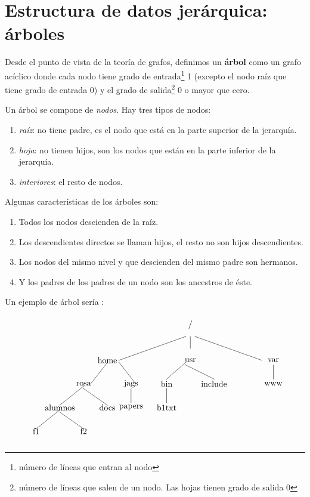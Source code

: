 \documentclass[10pt,a4paper,spanish]{report}
\begin{document}
\section{\textcolor[rgb]{0.3,0.4,0.8}Estructura de datos jerárquica: árboles}
\noindent
Desde el punto de vista de la teoría de grafos, definimos un \textbf{\textcolor[rgb]{0.3,0.4,0.8}{árbol}} como un grafo acíclico donde cada nodo tiene grado de entrada\footnote{número de líneas que entran al nodo} 1 (excepto el nodo raíz que tiene grado de entrada 0) y el grado de salida\footnote{número de líneas que salen de un nodo. Las hojas tienen grado de salida 0} 0 o mayor que cero.

\noindent
Un árbol se compone de \textit{\textcolor[rgb]{0.3,0.4,0.8}{nodos}}. Hay tres tipos de nodos:
\begin{enumerate}[$\heartsuit$]
\item \textit{\textcolor[rgb]{0.3,0.4,0.8}{raíz}}: no tiene padre, es el nodo que está en la parte superior de la jerarquía.
\item \textit{\textcolor[rgb]{0.3,0.4,0.8}{hoja}}: no tienen hijos, son los nodos que están en la parte inferior de la jerarquía.
\item \textit{\textcolor[rgb]{0.3,0.4,0.8}{interiores}}: el resto de nodos.
\end{enumerate}

\noindent
Algunas características de los árboles son:
\begin{enumerate}[---]
\item Todos los nodos descienden de la raíz.
\item Los descendientes directos se llaman hijos, el resto no son hijos descendientes.
\item Los nodos del mismo nivel y que descienden del mismo padre son hermanos.
\item Y los padres de los padres de un nodo son los ancestros de éste.
\end{enumerate}

\noindent
Un ejemplo de árbol sería \label{arbol_linux}:
\[\begin{xy}
,(0,0)*+=<10mm>[]\txt<2cm>{/}
,(0,-15)*+=<10mm>[]\txt<2cm>{usr}
,(-35,-15)*+=<10mm>[]\txt<2cm>{home}
,(35,-15)*+=<10mm>[]\txt<2cm>{var}
,(-45,-25)*+=<10mm>[]\txt<2cm>{rosa}
,(-25,-25)*+=<10mm>[]\txt<2cm>{jags}
,(-55,-35)*+=<10mm>[]\txt<2cm>{alumnos}
,(-35,-35)*+=<10mm>[]\txt<2cm>{docs}
,(-65,-45)*+=<10mm>[]\txt<2cm>{f1}
,(-45,-45)*+=<10mm>[]\txt<2cm>{f2}
,(-25,-35)*+=<10mm>[]\txt<2cm>{papers}
,(-10,-25)*+=<10mm>[]\txt<2cm>{bin}
,(10,-25)*+=<10mm>[]\txt<2cm>{include}
,(-10,-35)*+=<10mm>[]\txt<2cm>{b1txt}
,(35,-25)*+=<10mm>[]\txt<2cm>{www}

\ar@{-} (0,-5);(0,-10)
\ar@{-} (-2,-5);(-30,-15)
\ar@{-} (2,-5);(30,-15)
\ar@{-} (-35,-16);(-42,-25)
\ar@{-} (-30,-16);(-23,-25)
\ar@{-} (-45,-26);(-55,-34)
\ar@{-} (-45,-27);(-35,-34)
\ar@{-} (-55,-36);(-65,-44)
\ar@{-} (-55,-37);(-45,-44)
\ar@{-} (-25,-27);(-25,-33)
\ar@{-} (-2,-16);(-10,-23)
\ar@{-} (-2,-17);(10,-23)
\ar@{-} (-10,-27);(-10,-33)
\ar@{-} (35,-17);(35,-23)
\end{xy}\]
\end{document}
